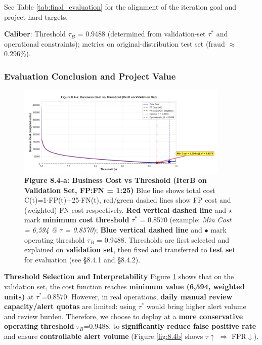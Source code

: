 \documentclass[sigplan,screen]{acmart}
\begin{document}
See Table \ref{tab:final_evaluation} for the alignment of the iteration goal and project hard targets.

\textbf{Caliber}: Threshold $\tau_B$ = 0.9488 (determined from validation-set $\tau^*$ and operational constraints); metrics on original-distribution test set (fraud $\approx$ 0.296\%).

\subsubsection{Evaluation Conclusion and Project Value}

\begin{figure}[h!]
    \centering
    \includegraphics[width=0.9\textwidth]{8.4a.jpg}
    \caption{\textbf{Figure 8.4-a: Business Cost vs Threshold (IterB on Validation Set, FP:FN = 1:25)} Blue line shows total cost C(t)=1$\cdot$FP(t)+25$\cdot$FN(t), red/green dashed lines show FP cost and (weighted) FN cost respectively. \textbf{Red vertical dashed line} and \textbf{$\star$} mark \textbf{minimum cost threshold} $\tau^*$ = 0.8570 (example: \textit{Min Cost = 6,594 @ $\tau$ = 0.8570}); \textbf{Blue vertical dashed line} and $\bullet$ mark operating threshold $\tau_B$ = 0.9488. Thresholds are first selected and explained on \textbf{validation set}, then fixed and transferred to \textbf{test set} for evaluation (see \S8.4.1 and \S8.4.2).}
    \label{fig:8.4a}
\end{figure}

\textbf{Threshold Selection and Interpretability} Figure \ref{fig:8.4a} shows that on the validation set, the cost function reaches \textbf{minimum value (6,594, weighted units)} at $\tau^*$=0.8570. However, in real operations, \textbf{daily manual review capacity/alert quotas} are limited: using $\tau^*$ would bring higher alert volume and review burden. Therefore, we choose to deploy at a \textbf{more conservative operating threshold} $\tau_B$=0.9488, to \textbf{significantly reduce false positive rate} and ensure \textbf{controllable alert volume} (Figure \ref{fig:8.4b} shows $\tau\uparrow$ $\Rightarrow$ FPR$\downarrow$).
\end{document}
